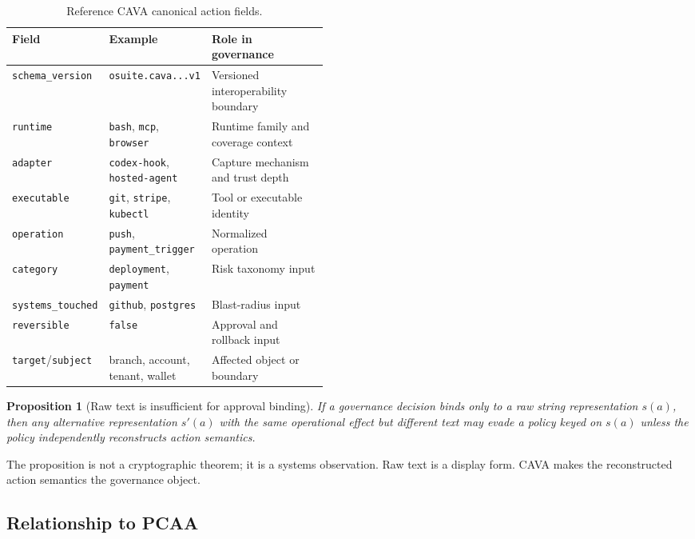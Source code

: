 \documentclass[11pt]{article}
\newtheorem{proposition}{Proposition}
\begin{document}
\begin{table}[t]
\centering
\small
\caption{Reference CAVA canonical action fields.}
\label{tab:canonical-action}
\begin{tabularx}{\linewidth}{@{}>{\raggedright\arraybackslash}p{0.22\linewidth}>{\raggedright\arraybackslash}p{0.24\linewidth}X@{}}
\toprule
Field & Example & Role in governance \\
\midrule
\texttt{schema\_version} & \texttt{osuite.cava...v1} & Versioned interoperability boundary \\
\texttt{runtime} & \texttt{bash}, \texttt{mcp}, \texttt{browser} & Runtime family and coverage context \\
\texttt{adapter} & \texttt{codex-hook}, \texttt{hosted-agent} & Capture mechanism and trust depth \\
\texttt{executable} & \texttt{git}, \texttt{stripe}, \texttt{kubectl} & Tool or executable identity \\
\texttt{operation} & \texttt{push}, \texttt{payment\_trigger} & Normalized operation \\
\texttt{category} & \texttt{deployment}, \texttt{payment} & Risk taxonomy input \\
\texttt{systems\_touched} & \texttt{github}, \texttt{postgres} & Blast-radius input \\
\texttt{reversible} & \texttt{false} & Approval and rollback input \\
\texttt{target}/\texttt{subject} & branch, account, tenant, wallet & Affected object or boundary \\
\bottomrule
\end{tabularx}
\end{table}

\begin{proposition}[Raw text is insufficient for approval binding]
If a governance decision binds only to a raw string representation $s(a)$, then any alternative representation $s'(a)$ with the same operational effect but different text may evade a policy keyed on $s(a)$ unless the policy independently reconstructs action semantics.
\end{proposition}

\noindent The proposition is not a cryptographic theorem; it is a systems observation. Raw text is a display form. CAVA makes the reconstructed action semantics the governance object.

\subsection{Relationship to PCAA}
\end{document}
